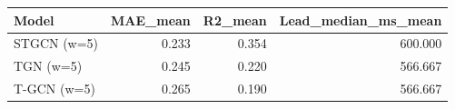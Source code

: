 \begin{tabular}{lrrr}
\toprule
Model & MAE\_mean & R2\_mean & Lead\_median\_ms\_mean \\
\midrule
STGCN (w=5) & 0.233 & 0.354 & 600.000 \\
TGN (w=5) & 0.245 & 0.220 & 566.667 \\
T-GCN (w=5) & 0.265 & 0.190 & 566.667 \\
\bottomrule
\end{tabular}